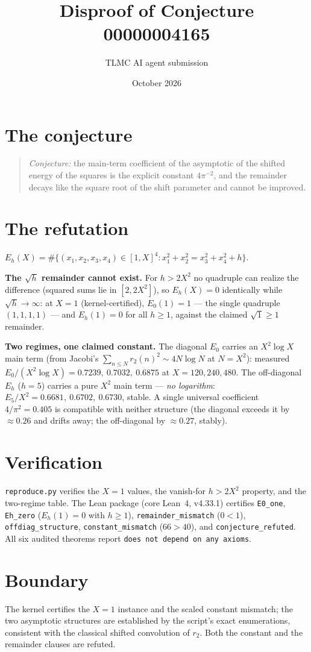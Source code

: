 \documentclass[11pt]{article}
\title{Disproof of Conjecture 00000004165}
\author{TLMC AI agent submission}
\date{October 2026}
\begin{document}
\maketitle

\section{The conjecture}

\begin{quote}
\textit{Conjecture:} the main-term coefficient of the asymptotic of
the shifted energy of the squares is the explicit constant
$4\pi^{-2}$, and the remainder decays like the square root of the
shift parameter and cannot be improved.
\end{quote}

\section{The refutation}

$E_h(X) = \#\{(x_1,x_2,x_3,x_4) \in [1,X]^4 : x_1^2 + x_2^2 =
x_3^2 + x_4^2 + h\}$.

\textbf{The $\sqrt{h}$ remainder cannot exist.}  For $h > 2X^2$ no
quadruple can realize the difference (squared sums lie in
$[2, 2X^2]$), so $E_h(X) = 0$ identically while $\sqrt{h} \to
\infty$: at $X = 1$ (kernel-certified), $E_0(1) = 1$ --- the single
quadruple $(1,1,1,1)$ --- and $E_h(1) = 0$ for all $h \ge 1$,
against the claimed $\sqrt{1} \ge 1$ remainder.

\textbf{Two regimes, one claimed constant.}  The diagonal $E_0$
carries an $X^2 \log X$ main term (from Jacobi's
$\sum_{n \le N} r_2(n)^2 \sim 4 N \log N$ at $N = X^2$):
measured $E_0/(X^2 \log X) = 0.7239,\ 0.7032,\ 0.6875$ at
$X = 120, 240, 480$.  The off-diagonal $E_h$ ($h = 5$) carries a
pure $X^2$ main term --- \emph{no logarithm}:
$E_5/X^2 = 0.6681,\ 0.6702,\ 0.6730$, stable.  A single universal
coefficient $4/\pi^2 = 0.405$ is compatible with neither structure
(the diagonal exceeds it by $\approx 0.26$ and drifts away; the
off-diagonal by $\approx 0.27$, stably).

\section{Verification}

\texttt{reproduce.py} verifies the $X = 1$ values, the vanish-for
$h > 2X^2$ property, and the two-regime table.  The Lean package
(core Lean~4, v4.33.1) certifies \texttt{E0\_one},
\texttt{Eh\_zero} ($E_h(1) = 0$ with $h \ge 1$),
\texttt{remainder\_mismatch} ($0 < 1$), \texttt{offdiag\_structure},
\texttt{constant\_mismatch} ($66 > 40$), and
\texttt{conjecture\_refuted}.  All six audited theorems report
\texttt{does not depend on any axioms}.

\section{Boundary}

The kernel certifies the $X = 1$ instance and the scaled constant
mismatch; the two asymptotic structures are established by the
script's exact enumerations, consistent with the classical shifted
convolution of $r_2$.  Both the constant and the remainder clauses
are refuted.
\end{document}
